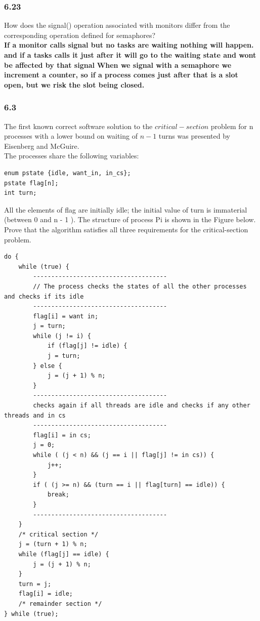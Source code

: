 \documentclass[a4paper,10pt,titlepage]{report}
\begin{document}
\subsubsection{6.23} How does the signal() operation associated with monitors differ from the corresponding operation defined for semaphores?\\

\textbf{
If a monitor calls signal but no tasks are waiting nothing will happen. and if a tasks calls it just after it will go to the waiting state and wont be affected by that signal
}
\textbf{
When we signal with a semaphore we increment a counter, so if a process comes just after that is a slot open, but we risk the slot being closed.
}


\subsubsection{6.3}
The first known correct software solution to the $critical-section$ problem for n processes with a lower bound on waiting of $n-1$ turns was presented by Eisenberg and McGuire. \\
The processes share the following variables:

\begin{lstlisting}[frame=single]
enum pstate {idle, want_in, in_cs};
pstate flag[n];
int turn;
\end{lstlisting}
All the elements of flag are initially idle; the initial value of turn is immaterial (between 0 and n - 1 ). The structure of process Pi is shown in the Figure below. Prove that the algorithm satisfies all three requirements for the critical-section problem.\\

\begin{lstlisting}[frame=single]
do {
    while (true) {
    	-------------------------------------
    	// The process checks the states of all the other processes and checks if its idle
    	-------------------------------------
        flag[i] = want in;
        j = turn;
        while (j != i) {
            if (flag[j] != idle) {
            j = turn;
        } else {
            j = (j + 1) % n;
        }
        -------------------------------------
        checks again if all threads are idle and checks if any other threads and in cs
        -------------------------------------
        flag[i] = in cs;
        j = 0;
        while ( (j < n) && (j == i || flag[j] != in cs)) {
            j++;
        }
        if ( (j >= n) && (turn == i || flag[turn] == idle)) {
            break;
        }
        -------------------------------------
    }
    /* critical section */
    j = (turn + 1) % n;
    while (flag[j] == idle) {
        j = (j + 1) % n;
    }
    turn = j;
    flag[i] = idle;
    /* remainder section */
} while (true);
\end{lstlisting}
\end{document}
